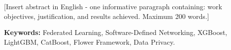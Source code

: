 \section*{}

[Insert abstract in English - one informative paragraph containing: work objectives, justification, and results achieved. Maximum 200 words.]

{\bf Keywords:} Federated Learning, Software-Defined Networking, XGBoost, LightGBM, CatBoost, Flower Framework, Data Privacy.
